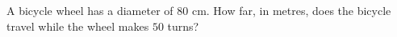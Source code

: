A bicycle wheel has a diameter of $80$ cm. How far, in metres, does the bicycle travel while the wheel makes $50$ turns?
